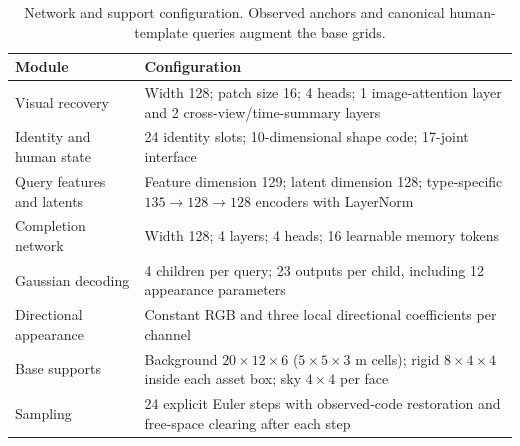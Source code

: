 \begin{table}[H]
\centering\small
\caption{Network and support configuration. Observed anchors and canonical human-template queries augment the base grids.}
\label{tab:network-config}
\begin{tabular}{@{}lp{}@{}}
\toprule
Module & Configuration \\
\midrule
Visual recovery & Width 128; patch size 16; 4 heads; 1 image-attention layer and 2 cross-view/time-summary layers \\
Identity and human state & 24 identity slots; 10-dimensional shape code; 17-joint interface \\
Query features and latents & Feature dimension 129; latent dimension 128; type-specific $135\rightarrow128\rightarrow128$ encoders with LayerNorm \\
Completion network & Width 128; 4 layers; 4 heads; 16 learnable memory tokens \\
Gaussian decoding & 4 children per query; 23 outputs per child, including 12 appearance parameters \\
Directional appearance & Constant RGB and three local directional coefficients per channel \\
Base supports & Background $20\times12\times6$ ($5\times5\times3$ m cells); rigid $8\times4\times4$ inside each asset box; sky $4\times4$ per face \\
Sampling & 24 explicit Euler steps with observed-code restoration and free-space clearing after each step \\
\bottomrule
\end{tabular}
\end{table}
